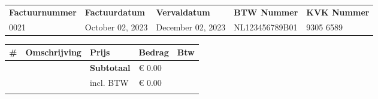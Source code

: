 \documentclass{article}%
\begin{document}
\begin{minipage}{\textwidth}%
\flushleft%
\begin{tabularx}{\textwidth}{XXXXX}%
\textbf{Factuurnummer}&\textbf{Factuurdatum}&\textbf{Vervaldatum}&\textbf{BTW Nummer}&\textbf{KVK Nummer}\\%
0021&October 02, 2023&December 02, 2023&NL123456789B01&9305 6589\\%
\end{tabularx}%
\linebreak%
\linebreak%
\linebreak%
\linebreak%
\begin{tabularx}{\textwidth}{lXlll}%
\textbf{\#}&\textbf{Omschrijving}&\textbf{Prijs}&\textbf{Bedrag}&\textbf{Btw}\\%
\hline%
&&\textbf{Subtotaal}&€ 0.00&\\%
&&incl. BTW&€ 0.00 \\ \cline{3-4}&\\%
\end{tabularx}%
\end{minipage}%
\end{document}
